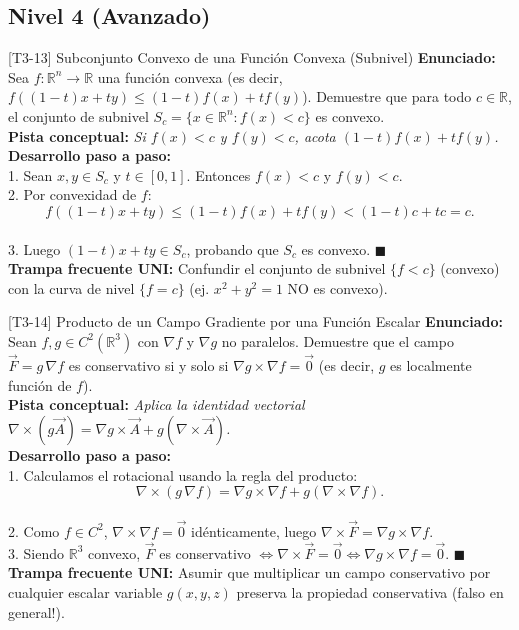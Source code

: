 \documentclass[11pt,a4paper]{article}
\begin{document}
\subsection{Nivel 4 (Avanzado)}

\begin{ejerciciobox}{[T3-13] Subconjunto Convexo de una Función Convexa (Subnivel)}
\textbf{Enunciado:} Sea $f: \mathbb{R}^n \to \mathbb{R}$ una función convexa (es decir, $f((1-t)x+ty) \le (1-t)f(x) + tf(y)$). Demuestre que para todo $c \in \mathbb{R}$, el conjunto de subnivel $S_c = \{x \in \mathbb{R}^n : f(x) < c\}$ es convexo.\\[0.2cm]
\textbf{Pista conceptual:} \emph{Si $f(x) < c$ y $f(y) < c$, acota $(1-t)f(x) + tf(y)$.}\\[0.2cm]
\textbf{Desarrollo paso a paso:}\\
1. Sean $x, y \in S_c$ y $t \in [0,1]$. Entonces $f(x) < c$ y $f(y) < c$.\\
2. Por convexidad de $f$:\\
$$f((1-t)x + ty) \le (1-t)f(x) + tf(y) < (1-t)c + tc = c.$$\\
3. Luego $(1-t)x + ty \in S_c$, probando que $S_c$ es convexo. $\blacksquare$\\[0.2cm]
\textbf{Trampa frecuente UNI:} Confundir el conjunto de subnivel $\{f < c\}$ (convexo) con la curva de nivel $\{f = c\}$ (ej. $x^2+y^2=1$ NO es convexo).
\end{ejerciciobox}

\begin{ejerciciobox}{[T3-14] Producto de un Campo Gradiente por una Función Escalar}
\textbf{Enunciado:} Sean $f, g \in C^2(\mathbb{R}^3)$ con $\nabla f$ y $\nabla g$ no paralelos. Demuestre que el campo $\vec{F} = g\,\nabla f$ es conservativo si y solo si $\nabla g \times \nabla f = \vec{0}$ (es decir, $g$ es localmente función de $f$).\\[0.2cm]
\textbf{Pista conceptual:} \emph{Aplica la identidad vectorial $\nabla \times (g\vec{A}) = \nabla g \times \vec{A} + g(\nabla \times \vec{A})$.}\\[0.2cm]
\textbf{Desarrollo paso a paso:}\\
1. Calculamos el rotacional usando la regla del producto:\\
$$\nabla \times (g\,\nabla f) = \nabla g \times \nabla f + g(\nabla \times \nabla f).$$\\
2. Como $f \in C^2$, $\nabla \times \nabla f = \vec{0}$ idénticamente, luego $\nabla \times \vec{F} = \nabla g \times \nabla f$.\\
3. Siendo $\mathbb{R}^3$ convexo, $\vec{F}$ es conservativo $\iff \nabla \times \vec{F} = \vec{0} \iff \nabla g \times \nabla f = \vec{0}$. $\blacksquare$\\[0.2cm]
\textbf{Trampa frecuente UNI:} Asumir que multiplicar un campo conservativo por cualquier escalar variable $g(x,y,z)$ preserva la propiedad conservativa (falso en general!).
\end{ejerciciobox}
\end{document}

